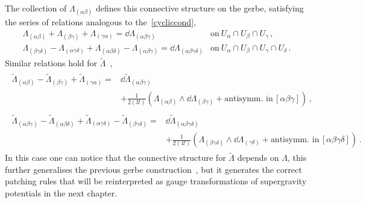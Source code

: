 \documentclass[debug]{phd}
\begin{document}
						The collection of $\Lambda_{(\alpha\beta)}$ defines this connective structure on the gerbe, satisfying the series of relations analogous to the~\eqref{cycliccond},
								\begin{equation}
									\begin{array}{lr}
										\Lambda_{(\alpha\beta)} + \Lambda_{(\beta\gamma)} +\Lambda_{(\gamma\alpha)} = \dd \Lambda_{(\alpha\beta\gamma)} & \mbox{on} \ U_\alpha \cap U_\beta \cap U_\gamma \, , \\
										\Lambda_{(\beta\gamma\delta)} - \Lambda_{(\alpha\gamma\delta)} + \Lambda_{(\alpha\beta\delta)} - \Lambda_{(\alpha\beta\gamma)} = \dd \Lambda_{(\alpha\beta\gamma\delta)} & \mbox{on} \ U_\alpha \cap U_\beta \cap U_\gamma \cap U_\delta \, .
									\end{array}
								\end{equation}
						Similar relations hold for $\tilde{\Lambda}$~\cite{waldram4}, 
								\begin{align*}
									\begin{split}
										\tilde{\Lambda}_{(\alpha\beta)} - \tilde{\Lambda}_{(\beta\gamma)} +\tilde{\Lambda}_{(\gamma\alpha)} = &\dd \tilde{\Lambda}_{(\alpha\beta\gamma)} \\
										& + \tfrac{1}{2 (3!)}\left(\Lambda_{(\alpha\beta)} \wedge \dd \Lambda_{(\beta\gamma)} + \mbox{antisymm. in}\, [\alpha\beta\gamma] \right) \, ,
									\end{split}
									\\[2mm]
									\begin{split}
										\tilde{\Lambda}_{(\alpha\beta\gamma)} - \tilde{\Lambda}_{(\alpha\beta\delta)} + \tilde{\Lambda}_{(\alpha\gamma\delta)} - \tilde{\Lambda}_{(\beta\gamma\delta)} = &\dd \tilde{\Lambda}_{(\alpha\beta\gamma\delta)} \\
										& + \tfrac{1}{2 (4!)}\left(\Lambda_{(\beta\gamma\delta)} \wedge \dd \Lambda_{(\gamma\delta)} + \mbox{antisymm. in}\, [\alpha\beta\gamma\delta] \right)\, .
									\end{split}
								\end{align*}
						In this case one can notice that the connective structure for $\tilde{\Lambda}$ depends on $\Lambda$, this further generalises the previous gerbe construction~\cite{HitchinLagrangian}, but it generates the correct patching rules that will be reinterpreted as gauge transformations of supergravity potentials in the next chapter.
						
\end{document}
